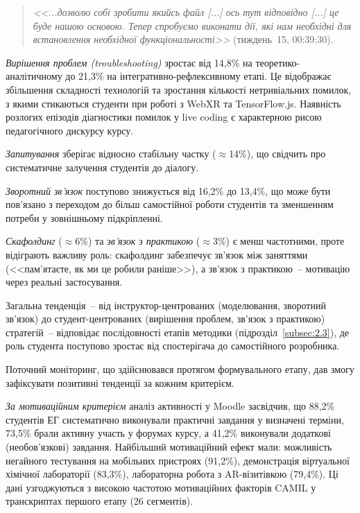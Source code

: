 \begin{quote}
\textit{<<...дозволю собі зробити якийсь файл \textnormal{[...]} ось тут відповідно \textnormal{[...]} це буде нашою основою. Тепер спробуємо виконати дії, які нам необхідні для встановлення необхідної функціональності>>} (тиждень~15, 00:39:30).
\end{quote}

\textit{Вирішення проблем (troubleshooting)} зростає від 14,8\% на теоретико-аналітичному до 21,3\% на інтегративно-рефлексивному етапі. Це відображає збільшення складності технологій та зростання кількості нетривіальних помилок, з якими стикаються студенти при роботі з WebXR та TensorFlow.js. Наявність розлогих епізодів діагностики помилок у live coding є характерною рисою педагогічного дискурсу курсу.

\textit{Запитування} зберігає відносно стабільну частку ($\approx$14\%), що свідчить про систематичне залучення студентів до діалогу.

\textit{Зворотний зв'язок} поступово знижується від 16,2\% до 13,4\%, що може бути пов'язано з переходом до більш самостійної роботи студентів та зменшенням потреби у зовнішньому підкріпленні.

\textit{Скафолдинг} ($\approx$6\%) та \textit{зв'язок з практикою} ($\approx$3\%) є менш частотними, проте відіграють важливу роль: скафолдинг забезпечує зв'язок між заняттями (<<пам'ятаєте, як ми це робили раніше>>), а зв'язок з практикою~-- мотивацію через реальні застосування.

Загальна тенденція~-- від інструктор-центрованих (моделювання, зворотний зв'язок) до студент-центрованих (вирішення проблем, зв'язок з практикою) стратегій~-- відповідає послідовності етапів методики (підрозділ~\ref{subsec:2.3}), де роль студента поступово зростає від спостерігача до самостійного розробника.


Поточний моніторинг, що здійснювався протягом формувального етапу, дав змогу зафіксувати позитивні тенденції за кожним критерієм.

\textit{За мотиваційним критерієм} аналіз активності у Moodle засвідчив, що 88,2\% студентів ЕГ систематично виконували практичні завдання у визначені терміни, 73,5\% брали активну участь у форумах курсу, а 41,2\% виконували додаткові (необов'язкові) завдання. Найбільший мотиваційний ефект мали: можливість негайного тестування на мобільних пристроях (91,2\%), демонстрація віртуальної хімічної лабораторії (83,3\%), лабораторна робота з AR-візитівкою (79,4\%). Ці дані узгоджуються з високою частотою мотиваційних факторів CAMIL у транскриптах першого етапу (26 сегментів).

